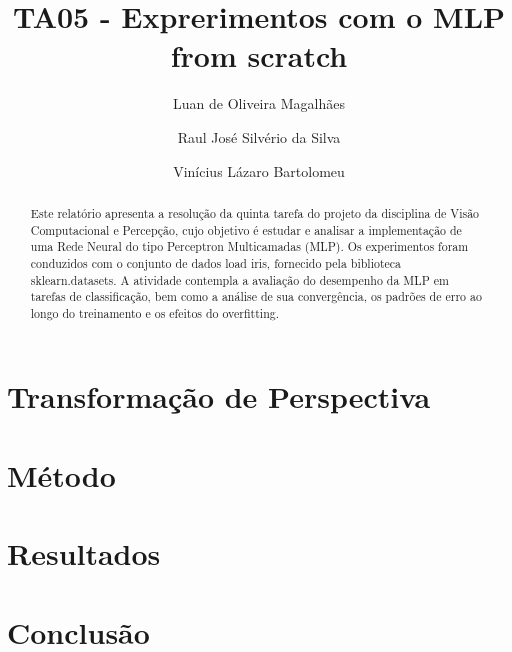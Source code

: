 \documentclass[sigconf,nonacm]{acmart}
\begin{document}
\title{TA05 - Exprerimentos com o MLP from scratch}

\author{Luan de Oliveira Magalhães}

\author{Raul José Silvério da Silva}

\author{Vinícius Lázaro Bartolomeu}

\begin{abstract}
Este relatório apresenta a resolução da quinta tarefa do projeto da disciplina de Visão Computacional e Percepção, cujo objetivo é estudar e analisar a implementação de uma Rede Neural do tipo Perceptron Multicamadas (MLP). Os experimentos foram conduzidos com o conjunto de dados load iris, fornecido pela biblioteca sklearn.datasets. A atividade contempla a avaliação do desempenho da MLP em tarefas de classificação, bem como a análise de sua convergência, os padrões de erro ao longo do treinamento e os efeitos do overfitting.
\end{abstract}


\maketitle


\section{Transformação de Perspectiva}



\section{Método}



\section{Resultados}




\section{Conclusão}



\end{document}

